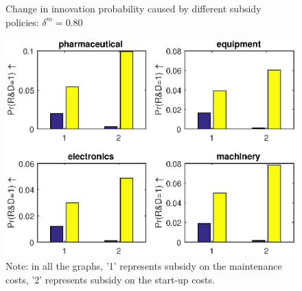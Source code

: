 \documentclass[English]{article}
\begin{document}
\begin{center}
\begin{figure}[H]
\caption{Change in innovation probability caused by different subsidy policies: $\delta^m=0.80$}
\label{F7}
\begin{centering}
\includegraphics[width=1\textwidth]{ProbChange.eps}
\par\end{centering}
\caption*{\small{}Note: in all the graphs, '1' represents subsidy on the maintenance costs, '2' represents subsidy on the start-up costs.}{\small \par}
\end{figure}
\par\end{center}
\end{document}
